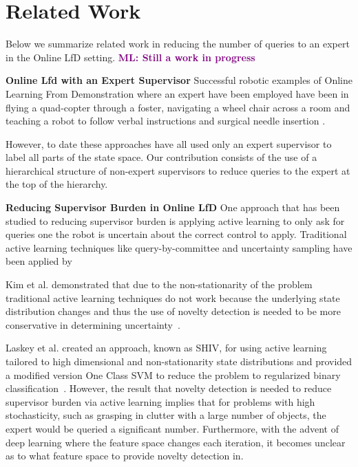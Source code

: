 \documentclass[10pt, conference]{ieeeconf}      %
\newcommand{\mlnote}[1]{\ifthenelse{ \boolean{include-notes}}%
 {\textcolor{purple}{\textbf{ML: #1}}}{}}
\begin{document}
\section{Related Work}
Below we summarize related work in reducing the number of queries to an expert in the Online LfD setting.\mlnote{Still a work in progress}

\noindent \textbf{Online Lfd with an Expert Supervisor}
Successful robotic examples of Online Learning From Demonstration where an expert have been employed have been in flying a quad-copter through a foster, navigating a wheel chair across a room and teaching a robot to follow verbal instructions and surgical needle insertion \cite{ross2013learning, kim2013maximum, duvallet2013imitation, laskey}. 

However, to date these approaches have all used only an expert supervisor to label all parts of the state space. Our contribution consists of the use of a hierarchical structure of non-expert supervisors to reduce queries to the expert at the top of the hierarchy. 

\noindent\textbf{Reducing Supervisor Burden in Online LfD} One approach that has been studied to reducing supervisor burden is applying active learning to only ask for queries one the robot is uncertain about the correct control to apply. Traditional active learning techniques like query-by-committee and uncertainty sampling have been applied by \cite{chernova2009interactive,judah2011active,grollman2007dogged}

Kim et al. demonstrated that due to the non-stationarity of the problem traditional active learning techniques do not work because the underlying state distribution changes and thus the use of novelty detection is needed to be more conservative in determining uncertainty~\cite{kim2013maximum}.

Laskey et al. created an approach, known as SHIV, for using active learning tailored to high dimensional and non-stationarity state distributions and  provided a modified version One Class SVM to reduce the problem to regularized binary classification~\cite{laskey}. However, the result that novelty detection is needed to reduce supervisor burden via active learning implies that for problems with high stochasticity, such as grasping in clutter with a large number of objects, the expert would be queried a significant number. Furthermore, with the advent of deep learning where the feature space changes each iteration, it becomes unclear as to what feature space to provide novelty detection in.
\end{document}
